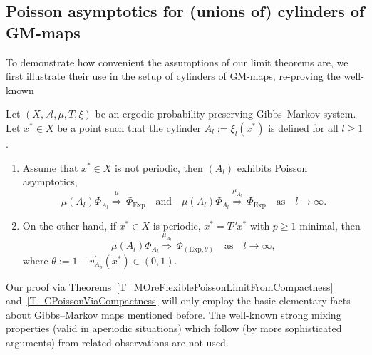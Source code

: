 \documentclass[AHL,Unicode,longabstracts]{cedram}
\newcommand{\clA}{\mathcal{A}}
\newcommand{\Expl}{\mathrm{Exp}}
\newcommand*{\alphenumi}{\renewcommand*{\theenumi}{\alph{enumi}}}
\begin{document}
\subsection{Poisson asymptotics for (unions of) cylinders of GM-maps}
To demonstrate how convenient the assumptions of our limit theorems are, we first illustrate their use in the setup of cylinders of GM-maps, re-proving the well-known

\begin{theo}\label{T_PoissonAsyGMCyls}
Let $(X,\clA,\mu,T,\xi)$ be an ergodic probability preserving Gibbs--Markov system. Let $x^{\ast}\in X$ be a point such that the cylinder $A_{l}:=\xi_{l}(x^{\ast})$ is defined for all $l\geq 1$.
\begin{enumerate}\alphenumi
\item\label{theo10.1.a} Assume that $x^{\ast}\in X$ is not periodic, then $(A_{l})$ exhibits Poisson asymptotics,
\begin{equation}
\mu(A_{l})\Phi_{A_{l}}\overset{\mu}{\Longrightarrow}\,\Phi_{\Expl } \quad \text{and}\quad\mu(A_{l})\Phi_{A_{l}}\overset{\mu_{A_{l}} }{\Longrightarrow}\,\Phi_{\Expl}\quad\text{as}\quad l\rightarrow
\infty.
\end{equation}
\item\label{theo10.1.b} On the other hand, if $x^{\ast}\in X$ is periodic, $x^{\ast} =T^{p}x^{\ast}$ with $p\geq1$ minimal, then
\begin{equation}
\mu(A_{l})\Phi_{A_{l}}\overset{\mu_{A_{l}}}{\Longrightarrow}\,\Phi _{(\Expl,\theta)} \quad\text{as}\quad l\rightarrow\infty,
\end{equation}
where $\theta:=1-v_{A_{p}}^{\prime}(x^{\ast})\in(0,1)$.
\end{enumerate}
\end{theo}




Our proof via Theorems~\ref{T_MOreFlexiblePoissonLimitFromCompactness} and~\ref{T_CPoissonViaCompactness} will only employ the basic elementary facts about Gibbs--Markov maps mentioned before. The well-known strong mixing properties (valid in aperiodic situations) which follow (by more sophisticated arguments) from related observations are not used.
\end{document}

